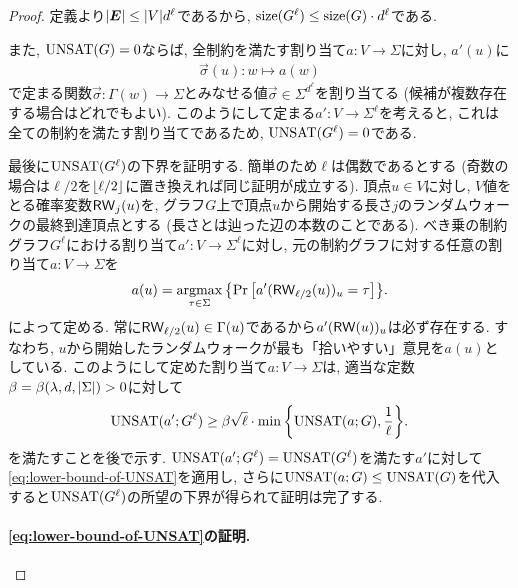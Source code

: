 \begin{proof}

定義より$\abs{\boldsymbol{E}} \le \abs{V}d^{\ell}$であるから, $\mathrm{size}(G^\ell) \le \mathrm{size}(G)\cdot d^\ell$である.

また, $\mathrm{UNSAT}(G)=0$ならば, 全制約を満たす割り当て$a\colon V \to \Sigma$に対し, $a'(u)$に
\begin{align*}
  \vec{\sigma}(u)\colon w \mapsto a(w)
\end{align*}
で定まる関数$\vec{\sigma}\colon \Gamma(w)\to\Sigma$とみなせる値$\vec{\sigma}\in\Sigma^{d^\ell}$を割り当てる (候補が複数存在する場合はどれでもよい).
このようにして定まる$a'\colon V\to\Sigma^{\ell}$を考えると, これは全ての制約を満たす割り当てであるため, $\mathrm{UNSAT}(G^\ell)=0$である.

最後に$\mathrm{UNSAT}(G^\ell)$の下界を証明する.
簡単のため$\ell$は偶数であるとする (奇数の場合は$\ell/2$を$\lfloor\ell/2\rfloor$に置き換えれば同じ証明が成立する).
頂点$u\in V$に対し, $V$値をとる確率変数$\mathsf{RW}_j(u)$を, グラフ$G$上で頂点$u$から開始する長さ$j$のランダムウォークの最終到達頂点とする (長さとは辿った辺の本数のことである).
べき乗の制約グラフ$G^\ell$における割り当て$a'\colon V \to \Sigma^{\ell}$に対し, 元の制約グラフに対する任意の割り当て$a\colon V\to\Sigma$を
\begin{align}
  a(u) = \mathop{\mathrm{argmax}}_{\tau \in \Sigma} \qty{ \Pr\qty[ a'(\mathsf{RW}_{\ell/2}(u))_u = \tau ] }. \label{eq:argmax-of-RW}
\end{align}
によって定める.
常に$\mathsf{RW}_{\ell/2}(u)\in \Gamma(u)$であるから$a'(\mathsf{RW}(u))_u$は必ず存在する.
すなわち, $u$から開始したランダムウォークが最も「拾いやすい」意見を$a(u)$としている.
このようにして定めた割り当て$a\colon V \to \Sigma$は, 適当な定数$\beta=\beta(\lambda,d,\abs{\Sigma})>0$に対して
\begin{align}
  \mathrm{UNSAT}(a';G^\ell) \ge \beta\sqrt{\ell}\cdot \min\qty{ \mathrm{UNSAT}(a;G), \frac{1}{\ell} }. \label{eq:lower-bound-of-UNSAT}
\end{align}
を満たすことを後で示す. $\mathrm{UNSAT}(a';G^\ell)=\mathrm{UNSAT}(G^\ell)$を満たす$a'$に対して\cref{eq:lower-bound-of-UNSAT}を適用し, さらに$\mathrm{UNSAT}(a;G)\le \mathrm{UNSAT}(G)$を代入すると$\mathrm{UNSAT}(G^\ell)$の所望の下界が得られて証明は完了する.

\paragraph*{\cref{eq:lower-bound-of-UNSAT}の証明.}


\end{proof}
